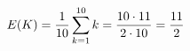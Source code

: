 \documentclass[preview]{standalone}
\begin{document}
\begin{align*}
\special{dvisvgm:raw <g id='unique000'>}E(K)=\frac1{10}\sum_{k=1}^{10}k=\frac{10\cdot11}{2\cdot10}=\frac{11}{2}\special{dvisvgm:raw </g>}
\end{align*}
\end{document}

